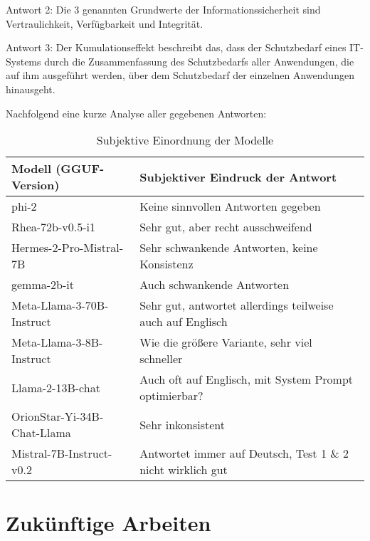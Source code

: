 \documentclass[german,report]{i1thesis}
\begin{document}
Antwort 2:
Die 3 genannten Grundwerte der Informationssicherheit sind Vertraulichkeit, Verfügbarkeit und Integrität.

Antwort 3:
Der Kumulationseffekt beschreibt das, dass der Schutzbedarf eines IT-Systems durch die Zusammenfassung des
Schutzbedarfs aller Anwendungen, die auf ihm ausgeführt werden, über dem Schutzbedarf der einzelnen
Anwendungen hinausgeht.

Nachfolgend eine kurze Analyse aller gegebenen Antworten:\\

\begin{table}[H]
    \centering
    \begin{tabular}{|l|l|}
        \hline
        \textbf{Modell (GGUF-Version)} & \textbf{Subjektiver Eindruck der Antwort}                   \\ \hline
        phi-2                          & Keine sinnvollen Antworten gegeben                          \\ \hline
        Rhea-72b-v0.5-i1               & Sehr gut, aber recht ausschweifend                          \\ \hline
        Hermes-2-Pro-Mistral-7B        & Sehr schwankende Antworten, keine Konsistenz                \\ \hline
        gemma-2b-it                    & Auch schwankende Antworten                                  \\ \hline
        Meta-Llama-3-70B-Instruct      & Sehr gut, antwortet allerdings teilweise auch auf Englisch  \\ \hline
        Meta-Llama-3-8B-Instruct       & Wie die größere Variante, sehr viel schneller               \\ \hline
        Llama-2-13B-chat               & Auch oft auf Englisch, mit System Prompt optimierbar?       \\ \hline
        OrionStar-Yi-34B-Chat-Llama    & Sehr inkonsistent                                           \\ \hline
        Mistral-7B-Instruct-v0.2       & Antwortet immer auf Deutsch, Test 1 \& 2 nicht wirklich gut \\ \hline
    \end{tabular}
    \caption{Subjektive Einordnung der Modelle}
    \label{tab:ergebnisse_zsmfassung}
\end{table}



\section{Zukünftige Arbeiten}%
\label{sec:zukuenftige-arbeiten}
\end{document}
